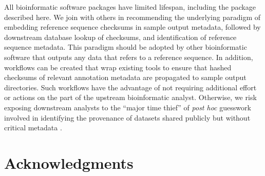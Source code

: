 \documentclass[10pt,letterpaper]{article}
\begin{document}
All bioinformatic software packages have limited lifespan, including
the package described here. We join with others in
recommending the underlying paradigm of embedding reference sequence
checksums in sample output metadata, followed by downstream database
lookup of checksums, and identification of reference sequence
metadata. This paradigm should be adopted by other bioinformatic
software that outputs any data that refers to a reference
sequence. In addition, workflows can be created that wrap existing
tools to ensure that hashed checksums of relevant annotation
metadata are propagated to sample output directories.
Such workflows have the advantage of not requiring additional
effort or actions on the part of the upstream bioinformatic
analyst. Otherwise, we risk exposing downstream analysts
to the ``major time thief'' of \textit{post hoc} guesswork involved in
identifying the provenance of datasets shared publicly but without
critical metadata \cite{Kanduri2017}.




\section*{Acknowledgments}
\end{document}
